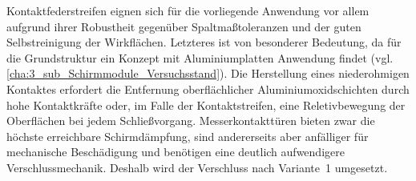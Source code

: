 Kontaktfederstreifen eignen sich für die vorliegende Anwendung vor allem aufgrund ihrer Robustheit gegenüber Spaltmaßtoleranzen und der guten Selbstreinigung der Wirkflächen. Letzteres ist von besonderer Bedeutung, da für die Grundstruktur ein Konzept mit Aluminiumplatten Anwendung findet (vgl. \Abschnitt\ref{cha:3_sub_Schirmmodule_Versuchsstand}). Die Herstellung eines niederohmigen Kontaktes erfordert die Entfernung oberflächlicher Aluminiumoxidschichten durch hohe Kontaktkräfte oder, im Falle der Kontaktstreifen, eine Reletivbewegung der Oberflächen bei jedem Schließvorgang. Messerkontakttüren bieten zwar die höchste erreichbare Schirmdämpfung, sind andererseits aber anfälliger für mechanische Beschädigung und benötigen eine deutlich aufwendigere Verschlussmechanik. Deshalb wird der Verschluss nach Variante~1 umgesetzt.

